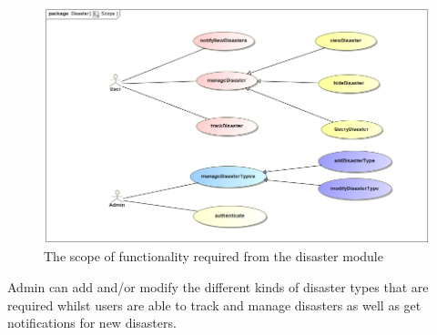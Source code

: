 
\begin{figure}[H]
	\centering
	\includegraphics[width=1.0\textwidth]{../images/Scope.jpg}
	\caption{The scope of functionality required from the disaster module \label{overflow}}
\end{figure}

Admin can add and/or modify the different kinds of disaster types that are required whilst users are able to track and manage disasters as well as get notifications for new disasters. 